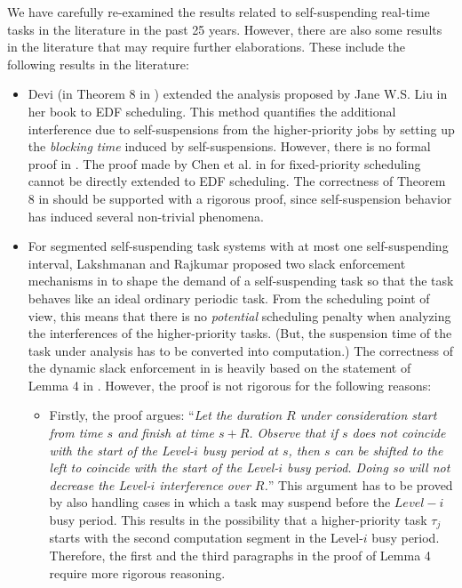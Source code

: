\label{sec:open-issues-existing}  
We have carefully re-examined the results related to self-suspending
real-time tasks in the literature in the past 25 years. However, there
are also some results in the literature that may require further
elaborations. These include the following results in the literature:
\begin{itemize}
\item Devi (in Theorem 8 in \cite[Section
  4.5]{DBLP:conf/ecrts/Devi03}) extended the analysis proposed by Jane
  W.S. Liu in her book \cite[Page 164-165]{Liu:2000:RS:518501} to
  EDF scheduling. This method quantifies the additional interference
  due to self-suspensions from the higher-priority jobs by setting up
  the \emph{blocking time} induced by self-suspensions. However, there
  is no formal proof in \cite{DBLP:conf/ecrts/Devi03}. The proof made
  by Chen et al. in \cite{ChenHuangNelissen,ChenECRTS2016-suspension} for fixed-priority
  scheduling cannot be directly extended to EDF scheduling. The
  correctness of Theorem 8 in \cite[Section
  4.5]{DBLP:conf/ecrts/Devi03} should be supported with a rigorous
  proof, since self-suspension behavior has induced several
  non-trivial phenomena.

\item For segmented self-suspending task systems with at most one
  self-suspending interval, Lakshmanan and Rajkumar proposed two slack
  enforcement mechanisms in \cite{LR:rtas10} to shape the demand of a
  self-suspending task so that the task behaves like an ideal ordinary
  periodic
  task.  From the scheduling point of view, this means that there is
  no \emph{potential} scheduling penalty when analyzing the interferences of the
  higher-priority tasks. (But, the suspension time of the task under
  analysis has to be converted into computation.) The correctness of the dynamic slack
  enforcement in \cite{LR:rtas10} is heavily based on the statement of Lemma
  4 in \cite{LR:rtas10}. However, the proof is not rigorous for the
  following reasons:
  \begin{itemize}
  \item Firstly, the proof argues: ``\emph{Let the duration $R$ under
    consideration start from time $s$ and finish at time $s +
    R$. Observe that if $s$ does not coincide with the start of the
    Level-$i$ busy period at $s$, then $s$ can be shifted to the left
    to coincide with the start of the Level-$i$ busy period. Doing so
    will not decrease the Level-$i$ interference over $R$.}'' This
    argument has to be proved by also handling cases in which a task
    may suspend before the $Level-i$ busy period. This results in the
    possibility that a higher-priority task $\tau_j$ starts with the
    second computation segment in the Level-$i$ busy
    period. Therefore, the first and the third paragraphs in the proof
    of Lemma 4 \cite{LR:rtas10} require more rigorous reasoning.


\end{itemize}
\end{itemize}

